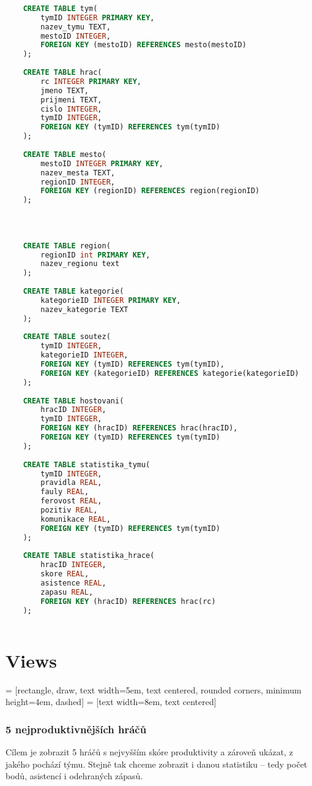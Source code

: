 \documentclass[11pt,oneside,american,czech]{book}
\begin{document}
\begin{lstlisting}[language=SQL]
	
	CREATE TABLE tym(
		tymID INTEGER PRIMARY KEY,
		nazev_tymu TEXT,
		mestoID INTEGER,
		FOREIGN KEY (mestoID) REFERENCES mesto(mestoID)
	);
	
	CREATE TABLE hrac(
		rc INTEGER PRIMARY KEY,
		jmeno TEXT,
		prijmeni TEXT,
		cislo INTEGER,
		tymID INTEGER,
		FOREIGN KEY (tymID) REFERENCES tym(tymID)
	);
	
	CREATE TABLE mesto(
		mestoID INTEGER PRIMARY KEY,
		nazev_mesta TEXT,
		regionID INTEGER,
		FOREIGN KEY (regionID) REFERENCES region(regionID)
	);
	
	
	
	
	CREATE TABLE region(
		regionID int PRIMARY KEY,
		nazev_regionu text
	);
	
	CREATE TABLE kategorie(
		kategorieID INTEGER PRIMARY KEY,
		nazev_kategorie TEXT
	);
	
	CREATE TABLE soutez(
		tymID INTEGER,
		kategorieID INTEGER,
		FOREIGN KEY (tymID) REFERENCES tym(tymID),
		FOREIGN KEY (kategorieID) REFERENCES kategorie(kategorieID)
	);
	
	CREATE TABLE hostovani(
		hracID INTEGER,
		tymID INTEGER,
		FOREIGN KEY (hracID) REFERENCES hrac(hracID),
		FOREIGN KEY (tymID) REFERENCES tym(tymID)
	);
	
	CREATE TABLE statistika_tymu(
		tymID INTEGER,
		pravidla REAL,
		fauly REAL,
		ferovost REAL,
		pozitiv REAL,
		komunikace REAL,
		FOREIGN KEY (tymID) REFERENCES tym(tymID)
	);
	
	CREATE TABLE statistika_hrace(
		hracID INTEGER,
		skore REAL,
		asistence REAL,
		zapasu REAL,
		FOREIGN KEY (hracID) REFERENCES hrac(rc)
	);
	
\end{lstlisting}

\pagebreak
\section*{Views}

 = [rectangle, draw, text width=5em, text centered, rounded corners, minimum height=4em, dashed]
 = [text width=8em, text centered]

\subsubsection*{5 nejproduktivnějších hráčů}

Cílem je zobrazit 5 hráčů s nejvyšším skóre produktivity a zároveň ukázat, z jakého pochází týmu. Stejně tak chceme zobrazit i danou statistiku -- tedy počet bodů, asistencí i odehraných zápasů.
\end{document}
